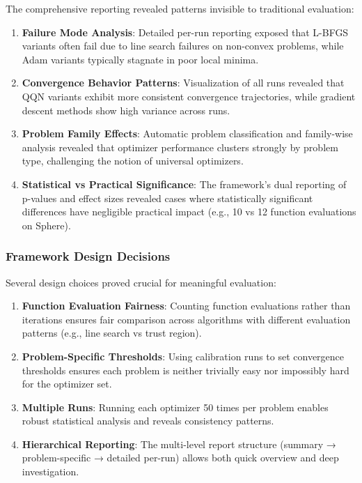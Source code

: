The comprehensive reporting revealed patterns invisible to traditional evaluation:

\begin{enumerate}
\def\labelenumi{\arabic{enumi}.}
\tightlist
\item
  \textbf{Failure Mode Analysis}: Detailed per-run reporting exposed that L-BFGS variants often fail due to line search failures on non-convex problems, while Adam variants typically stagnate in poor local minima.
\item
  \textbf{Convergence Behavior Patterns}: Visualization of all runs revealed that QQN variants exhibit more consistent convergence trajectories, while gradient descent methods show high variance across runs.
\item
  \textbf{Problem Family Effects}: Automatic problem classification and family-wise analysis revealed that optimizer performance clusters strongly by problem type, challenging the notion of universal optimizers.
\item
  \textbf{Statistical vs Practical Significance}: The framework's dual reporting of p-values and effect sizes revealed cases where statistically significant differences have negligible practical impact (e.g., 10 vs 12 function evaluations on Sphere).
\end{enumerate}

\hypertarget{framework-design-decisions}{%
\subsubsection{Framework Design Decisions}\label{framework-design-decisions}}

Several design choices proved crucial for meaningful evaluation:

\begin{enumerate}
\def\labelenumi{\arabic{enumi}.}
\tightlist
\item
  \textbf{Function Evaluation Fairness}: Counting function evaluations rather than iterations ensures fair comparison across algorithms with different evaluation patterns (e.g., line search vs trust region).
\item
  \textbf{Problem-Specific Thresholds}: Using calibration runs to set convergence thresholds ensures each problem is neither trivially easy nor impossibly hard for the optimizer set.
\item
  \textbf{Multiple Runs}: Running each optimizer 50 times per problem enables robust statistical analysis and reveals consistency patterns.
\item
  \textbf{Hierarchical Reporting}: The multi-level report structure (summary → problem-specific → detailed per-run) allows both quick overview and deep investigation.
\end{enumerate}

